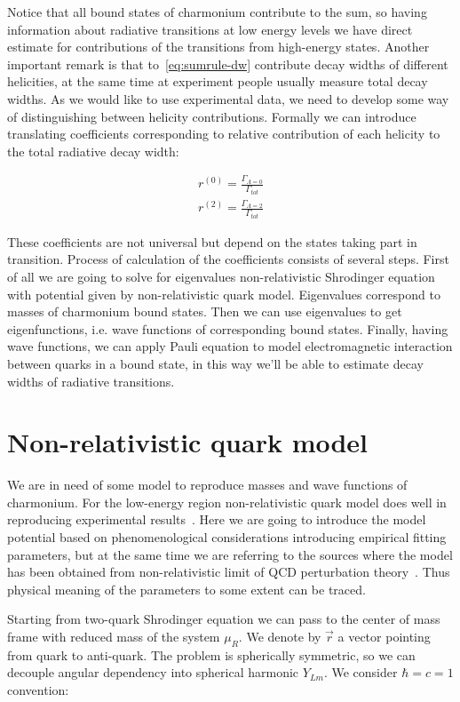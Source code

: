 Notice that all bound states of charmonium contribute to the sum, so having information about radiative transitions at low energy levels we have direct estimate for contributions of the transitions from high-energy states. Another important remark is that to~\ref{eq:sumrule-dw} contribute decay widths of different helicities, at the same time at experiment people usually measure total decay widths. As we would like to use experimental data, we need to develop some way of distinguishing between helicity contributions. Formally we can introduce translating coefficients corresponding to relative contribution of each helicity to the total radiative decay width:

\begin{align}
    r^{(0)} = \frac{\Gamma_{\Lambda=0}}{\Gamma_{tot}} \\
    r^{(2)} = \frac{\Gamma_{\Lambda=2}}{\Gamma_{tot}}
\end{align}

These coefficients are not universal but depend on the states taking part in transition. Process of calculation of the coefficients consists of several steps. First of all we are going to solve for eigenvalues non-relativistic Shrodinger equation with potential given by non-relativistic quark model. Eigenvalues correspond to masses of charmonium bound states. Then we can use eigenvalues to get eigenfunctions, i.e. wave functions of corresponding bound states. Finally, having wave functions, we can apply Pauli equation to model electromagnetic interaction between quarks in a bound state, in this way we'll be able to estimate decay widths of radiative transitions.

\section{Non-relativistic quark model}
We are in need of some model to reproduce masses and wave functions of charmonium. For the low-energy region non-relativistic quark model does well in reproducing experimental results~\cite{deng-charm, deng-bot}. Here we are going to introduce the model potential based on phenomenological considerations introducing empirical fitting parameters, but at the same time we are referring to the sources where the model has been obtained from non-relativistic limit of QCD perturbation theory~\cite{nrqm-perturb}. Thus physical meaning of the parameters to some extent can be traced.

Starting from two-quark Shrodinger equation we can pass to the center of mass frame with reduced mass of the system $\mu_R$. We denote by $\vec{r}$ a vector pointing from quark to anti-quark. The problem is spherically symmetric, so we can decouple angular dependency into spherical harmonic $Y_{Lm}$. We consider $\hbar = c = 1$ convention:


